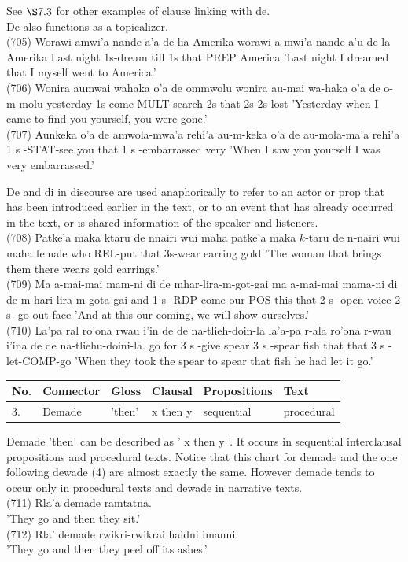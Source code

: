 \documentclass[10pt]{article}
\begin{document}
See \(\S 7.3\) for other examples of clause linking with de.\\
De also functions as a topicalizer.\\
(705) Worawi amwi'a nande a'a de lia Amerika worawi a-mwi'a nande a'u de la Amerika Last night 1s-dream till 1s that PREP America 'Last night I dreamed that I myself went to America.'\\
(706) Wonira aumwai wahaka o'a de ommwolu wonira au-mai wa-haka o'a de o-m-molu yesterday 1s-come MULT-search 2s that 2s-2s-lost 'Yesterday when I came to find you yourself, you were gone.'\\
(707) Aunkeka o'a de amwola-mwa'a rehi'a au-m-keka o'a de au-mola-ma'a rehi'a 1 s -STAT-see you that 1 s -embarrassed very 'When I saw you yourself I was very embarrassed.'

De and di in discourse are used anaphorically to refer to an actor or prop that has been introduced earlier in the text, or to an event that has already occurred in the text, or is shared information of the speaker and listeners.\\
(708) Patke'a maka ktaru de nnairi wui maha patke'a maka \(k\)-taru de n-nairi wui maha female who REL-put that 3s-wear earring gold 'The woman that brings them there wears gold earrings.'\\
(709) Ma a-mai-mai mam-ni di de mhar-lira-m-got-gai ma a-mai-mai mama-ni di de m-hari-lira-m-gota-gai and 1 s -RDP-come our-POS this that 2 s -open-voice 2 s -go out face 'And at this our coming, we will show ourselves.'\\
(710) La'pa ral ro'ona rwau i'in de de na-tlieh-doin-la la'a-pa r-ala ro'ona r-wau i'ina de de na-tliehu-doini-la. go for 3 s -give spear 3 s -spear fish that that 3 s -let-COMP-go 'When they took the spear to spear that fish he had let it go.'

\begin{center}
\begin{tabular}{|l|l|l|l|l|l|}
\hline
No. & Connector & Gloss & Clausal & Propositions & Text \\
\hline
3. & Demade & 'then' & x then y & sequential & procedural \\
\hline
\end{tabular}
\end{center}

Demade 'then' can be described as ' x then y '. It occurs in sequential interclausal propositions and procedural texts. Notice that this chart for demade and the one following dewade (4) are almost exactly the same. However demade tends to occur only in procedural texts and dewade in narrative texts.\\
(711) Rla'a demade ramtatna.\\
'They go and then they sit.'\\
(712) Rla' demade rwikri-rwikrai haidni imanni.\\
'They go and then they peel off its ashes.'
\end{document}
